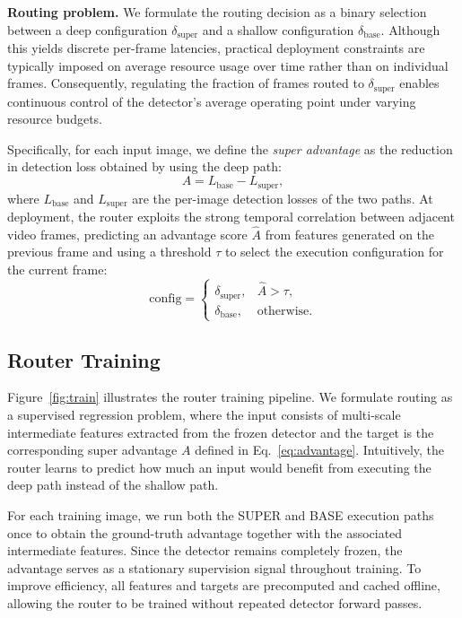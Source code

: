 \medskip
\noindent\textbf{Routing problem.}
We formulate the routing decision as a binary selection between a deep configuration $\delta_{\text{super}}$ and a shallow configuration $\delta_{\text{base}}$. Although this yields discrete per-frame latencies, practical deployment constraints are typically imposed on average resource usage over time rather than on individual frames. Consequently, regulating the fraction of frames routed to $\delta_{\text{super}}$ enables continuous control of the detector's average operating point under varying resource budgets.

Specifically, for each input image, we define the \emph{super advantage} as the reduction in detection loss obtained by using the deep path:
\begin{equation}
A = L_{\text{base}} - L_{\text{super}},
\label{eq:advantage}
\end{equation}
where $L_{\text{base}}$ and $L_{\text{super}}$ are the per-image detection
losses of the two paths. 
At deployment, the router exploits the strong temporal correlation between adjacent video frames, predicting an advantage score $\hat{A}$ from features generated on the previous frame and using a threshold $\tau$ to select the execution configuration for the current frame:
\begin{equation}
\text{config} =
\begin{cases}
\delta_{\text{super}}, & \hat{A} > \tau,\\[2pt]
\delta_{\text{base}},  & \text{otherwise.}
\end{cases}
\label{eq:route}
\end{equation}


\subsection{Router Training}
\label{sec:method_training}
Figure~\ref{fig:train} illustrates the router training pipeline.
We formulate routing as a supervised regression problem, where the input consists of multi-scale intermediate features extracted from the frozen detector and the target is the corresponding super advantage $A$ defined in Eq.~\ref{eq:advantage}. 
Intuitively, the router learns to predict how much an input would benefit from executing the deep path instead of the shallow path.

For each training image, we run both the SUPER and BASE execution paths once to obtain the ground-truth advantage together with the associated intermediate features.
Since the detector remains completely frozen, the advantage serves as a stationary supervision signal throughout training. 
To improve efficiency, all features and targets are precomputed and cached offline, allowing the router to be trained without repeated detector forward passes.


